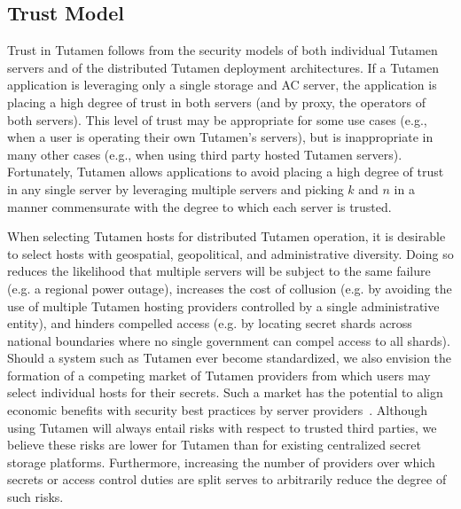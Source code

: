 \subsection{Trust Model}

Trust in Tutamen follows from the security models of both individual
Tutamen servers and of the distributed Tutamen deployment
architectures. If a Tutamen application is leveraging only a single
storage and AC server, the application is placing a high degree of
trust in both servers (and by proxy, the operators of both
servers). This level of trust may be appropriate for some use cases
(e.g., when a user is operating their own Tutamen's servers), but is
inappropriate in many other cases (e.g., when using third party hosted
Tutamen servers). Fortunately, Tutamen allows applications to avoid
placing a high degree of trust in any single server by leveraging
multiple servers and picking $k$ and $n$ in a manner commensurate with
the degree to which each server is trusted.

When selecting Tutamen hosts for distributed Tutamen operation, it is
desirable to select hosts with geospatial, geopolitical, and
administrative diversity. Doing so reduces the likelihood that
multiple servers will be subject to the same failure (e.g. a regional
power outage), increases the cost of collusion (e.g. by avoiding the
use of multiple Tutamen hosting providers controlled by a single
administrative entity), and hinders compelled access (e.g. by locating
secret shards across national boundaries where no single government
can compel access to all shards). Should a system such as Tutamen ever
become standardized, we also envision the formation of a competing
market of Tutamen providers from which users may select individual
hosts for their secrets. Such a market has the potential to align
economic benefits with security best practices by server
providers~\cite{sayler-phd}. Although using Tutamen will always entail
risks with respect to trusted third parties, we believe these risks
are lower for Tutamen than for existing centralized secret storage
platforms. Furthermore, increasing the number of providers over which
secrets or access control duties are split serves to arbitrarily
reduce the degree of such risks.

